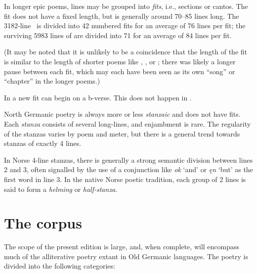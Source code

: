     In longer epic poems, lines may be grouped into \emph{fits}, i.e., sections or cantos.  The fit does not have a fixed length, but is generally around 70--85 lines long.  The 3182-line \Beowulf\ is divided into 42 numbered fits for an average of 76 lines per fit; the surviving 5983 lines of  are divided into 71 for an average of 84 lines per fit.

    (It may be noted that it is unlikely to be a coincidence that the length of the fit is similar to the length of shorter poems like , , or ; there was likely a longer pause between each fit, which may each have been seen as its own “song” or “chapter” in the longer poems.)

    In  a new fit can begin on a b-verse.  This does not happen in \Beowulf.

    North Germanic poetry is always more or less \emph{stanzaic} and does not have fits.  Each \emph{stanza} consists of several long-lines, and enjambment is rare.  The regularity of the stanzas varies by poem and meter, but there is a general trend towards stanzas of exactly 4 lines.

    In Norse 4-line stanzas, there is generally a strong semantic division between lines 2 and 3, often signalled by the use of a conjunction like \emph{ok} ‘and’ or \emph{ęn} ‘but’ as the first word in line 3.  In the native Norse poetic tradition, each group of 2 lines is said to form a \emph{helming} or \emph{half-stanza}.


\section{The corpus}

  The scope of the present edition is large, and, when complete, will encompass much of the alliterative poetry extant in Old Germanic languages.  The poetry is divided into the following categories:

